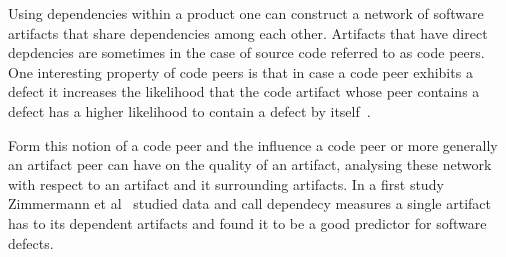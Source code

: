 Using dependencies within a product one can construct a network of software artifacts that share dependencies among each other.
Artifacts that have direct depdencies are sometimes in the case of source code referred to as code peers.
One interesting property of code peers is that in case a code peer exhibits a defect it increases the likelihood that the code artifact whose peer contains a defect has a higher likelihood to contain a defect by itself~\cite{nguyen:icse:2010}.

Form this notion of a code peer and the influence a code peer or more generally an artifact peer can have on the quality of an artifact, analysing these network with respect to an artifact and it surrounding artifacts.
In a first study Zimmermann et al~\cite{zimmermann:icse:2008} studied data and call dependecy measures a single artifact has to its dependent artifacts and found it to be a good predictor for software defects.

